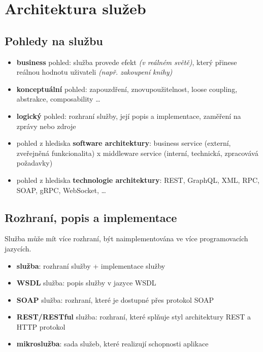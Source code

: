 \section{Architektura služeb}

\subsection{Pohledy na službu}

\begin{itemize}
    \item \textbf{business} pohled: služba provede efekt \textit{(v reálném světě)}, který přinese reálnou hodnotu uživateli \textit{(např. zakoupení knihy)}
    \item \textbf{konceptuální} pohled: zapouzdření, znovupoužitelnost, loose coupling, abstrakce, composability \ldots
    \item \textbf{logický} pohled: rozhraní služby, její popis a implementace, zaměření na zprávy nebo zdroje
    \item pohled z hlediska \textbf{software architektury}: business service (externí, zveřejněná funkcionalita) x middleware service (interní, technická, zpracovává požadavky)
    \item pohled z hlediska \textbf{technologie architektury}: REST, GraphQL, XML, RPC, SOAP, gRPC, WebSocket, \ldots
\end{itemize}

\subsection{Rozhraní, popis a implementace}

Služba může mít více rozhraní, být naimplementována ve více programovacích jazycích.

\begin{itemize}
    \item \textbf{služba}: rozhraní služby + implementace služby
    \item \textbf{WSDL} služba: popis služby v jazyce WSDL
    \item \textbf{SOAP} služba: rozhraní, které je dostupné přes protokol SOAP
    \item \textbf{REST/RESTful} služba: rozhraní, které splňuje styl architektury REST a HTTP protokol
    \item \textbf{mikroslužba}: sada služeb, které realizují schopnosti aplikace
\end{itemize}

